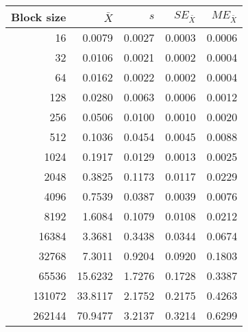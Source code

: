 \begin{tabular}{rrrrr}\toprule
{\small Block size} & $\bar{X}$ & $s$ & $SE_{\bar{X}}$ & $ME_{\bar{X}}$ \\\midrule
16 & 0.0079 & 0.0027 & 0.0003 & 0.0006\\
32 & 0.0106 & 0.0021 & 0.0002 & 0.0004\\
64 & 0.0162 & 0.0022 & 0.0002 & 0.0004\\
128 & 0.0280 & 0.0063 & 0.0006 & 0.0012\\
256 & 0.0506 & 0.0100 & 0.0010 & 0.0020\\
512 & 0.1036 & 0.0454 & 0.0045 & 0.0088\\
1024 & 0.1917 & 0.0129 & 0.0013 & 0.0025\\
2048 & 0.3825 & 0.1173 & 0.0117 & 0.0229\\
4096 & 0.7539 & 0.0387 & 0.0039 & 0.0076\\
8192 & 1.6084 & 0.1079 & 0.0108 & 0.0212\\
16384 & 3.3681 & 0.3438 & 0.0344 & 0.0674\\
32768 & 7.3011 & 0.9204 & 0.0920 & 0.1803\\
65536 & 15.6232 & 1.7276 & 0.1728 & 0.3387\\
131072 & 33.8117 & 2.1752 & 0.2175 & 0.4263\\
262144 & 70.9477 & 3.2137 & 0.3214 & 0.6299\\
\bottomrule
\end{tabular}

